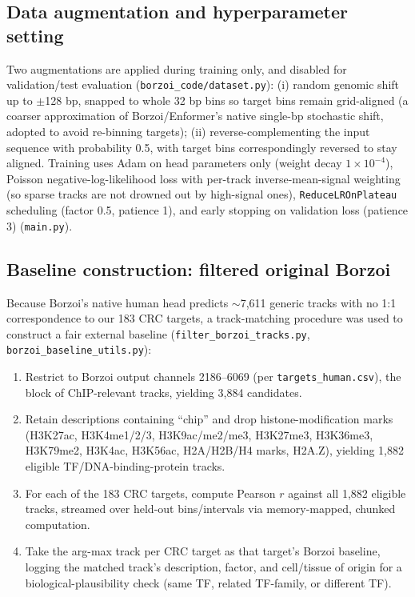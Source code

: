 \documentclass[10pt]{article}
\begin{document}
\subsection*{Data augmentation and hyperparameter setting}
Two augmentations are applied during training only, and disabled for validation/test evaluation (\texttt{borzoi\_code/dataset.py}): (i) random genomic shift up to $\pm$128 bp, snapped to whole 32 bp bins so target bins remain grid-aligned (a coarser approximation of Borzoi/Enformer's native single-bp stochastic shift, adopted to avoid re-binning targets); (ii) reverse-complementing the input sequence with probability 0.5, with target bins correspondingly reversed to stay aligned. Training uses Adam on head parameters only (weight decay $1\times10^{-4}$), Poisson negative-log-likelihood loss with per-track inverse-mean-signal weighting (so sparse tracks are not drowned out by high-signal ones), \texttt{ReduceLROnPlateau} scheduling (factor 0.5, patience 1), and early stopping on validation loss (patience 3) (\texttt{main.py}).

\subsection*{Baseline construction: filtered original Borzoi}
Because Borzoi's native human head predicts $\sim$7,611 generic tracks with no 1:1 correspondence to our 183 CRC targets, a track-matching procedure was used to construct a fair external baseline (\texttt{filter\_borzoi\_tracks.py}, \texttt{borzoi\_baseline\_utils.py}):
\begin{enumerate}
\item Restrict to Borzoi output channels 2186--6069 (per \texttt{targets\_human.csv}), the block of ChIP-relevant tracks, yielding 3{,}884 candidates.
\item Retain descriptions containing ``chip'' and drop histone-modification marks (H3K27ac, H3K4me1/2/3, H3K9ac/me2/me3, H3K27me3, H3K36me3, H3K79me2, H3K4ac, H3K56ac, H2A/H2B/H4 marks, H2A.Z), yielding 1{,}882 eligible TF/DNA-binding-protein tracks.
\item For each of the 183 CRC targets, compute Pearson $r$ against all 1{,}882 eligible tracks, streamed over held-out bins/intervals via memory-mapped, chunked computation.
\item Take the arg-max track per CRC target as that target's Borzoi baseline, logging the matched track's description, factor, and cell/tissue of origin for a biological-plausibility check (same TF, related TF-family, or different TF).
\end{enumerate}
\end{document}
